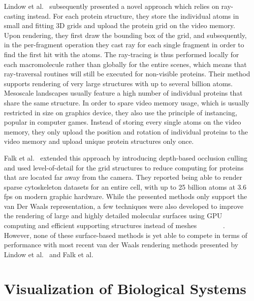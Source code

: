 Lindow et al.~\cite{lindow2012interactive} subsequently presented a novel approach which relies on ray-casting instead.
For each protein structure, they store the individual atoms in small and fitting 3D grids and upload the protein grid on the video memory.
Upon rendering, they first draw the bounding box of the grid, and subsequently, in the per-fragment operation they cast ray for each single fragment in order to find the first hit with the atoms.
The ray-tracing is thus performed locally for each macromolecule rather than globally for the entire scenes, which means that ray-traversal routines will still be executed for non-visible proteins.
Their method supports rendering of very large structures with up to several billion atoms.
Mesoscale landscapes usually feature a high number of individual proteins that share the same structure.
In order to spare video memory usage, which is usually restricted in size on graphics device, they also use the principle of instancing, popular in computer games.
Instead of storing every single atoms on the video memory, they only upload the position and rotation of individual proteins to the video memory and upload unique protein structures only once.

Falk et al.~\cite{falk2013atomistic} extended this approach by introducing depth-based occlusion culling and used level-of-detail for the grid structures to reduce computing for proteins that are located far away from the camera.
They reported being able to render sparse cytoskeleton datasets for an entire cell, with up to 25 billion atoms at 3.6 fps on modern graphic hardware.
While the presented methods only support the van Der Waals representation, a few techniques were also developed to improve the rendering of large and highly detailed molecular surfaces using GPU computing and efficient supporting structures instead of meshes ~\cite{krone2012fast}~\cite{parulek2012implicit} ~\cite{parulek2013fast} ~\cite{krone2011parallel} ~\cite{szecsi2012real}. 
However, none of these surface-based methods is yet able to compete in terms of performance with most recent van der Waals rendering methods presented by Lindow et al.~\cite{lindow2012interactive} and Falk et al.~\cite{falk2013atomistic}


\section{Visualization of Biological Systems}

